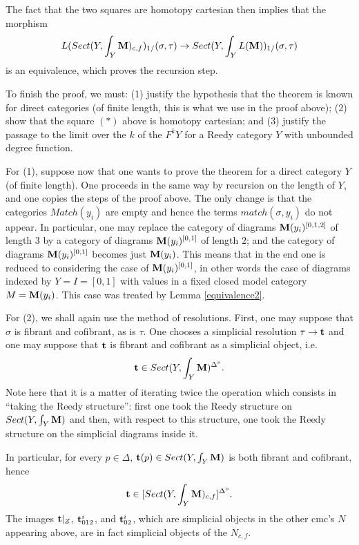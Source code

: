 The fact that the two squares are
homotopy cartesian then implies that the morphism
$$
L(Sect (Y, \int _Y{\bf M} )_{c,f})_{1/}(\sigma , \tau )
\rightarrow Sect (Y, \int _Y L({\bf M} ))_{1/}(\sigma , \tau )
$$
is an equivalence, which proves the recursion step.

To finish the proof, we must: (1) justify the hypothesis that
the theorem is known for direct categories (of finite length,
this is what we use in the proof above); (2) show that the
square $(\ast )$ above is homotopy cartesian; and (3) justify the
passage to the limit over
the $k$ of the $F^kY$ for a Reedy category $Y$ with
unbounded degree function.

For (1), suppose now that one wants to prove the theorem for a
direct category $Y$ (of finite length). One proceeds in the same way
by recursion on the length of $Y$, and one copies the steps of the
proof above. The only change is that the categories
$Match(y_i)$ are empty and hence the terms $match (\sigma , y_i)$
do not appear. In particular, one may replace
the category of diagrams
${\bf M} (y_i)^{[0,1,2]}$ of length $3$ by a category of
diagrams ${\bf M} (y_i)^{[0,1]}$ of length $2$; and the category of diagrams
${\bf M} (y_i)^{[0,1]}$ becomes just ${\bf M} (y_i)$. This means that in the end
one is reduced to considering the case of ${\bf M} (y_i)^{[0,1]}$,
in other words the case of diagrams indexed by $Y= I=[0,1]$ with values in
a fixed closed model category $M={\bf M} (y_i)$. This case was
treated by Lemma \ref{equivalence2}.

For (2), we shall again use the method of resolutions. First, one may
suppose that $\sigma$ is fibrant and cofibrant, as is $\tau$. One chooses
a simplicial resolution $\tau \rightarrow {\bf t}$ and one may
suppose that ${\bf t}$ is fibrant and cofibrant as a simplicial object,
i.e.
$$
{\bf t}\in Sect (Y,\int _Y{\bf M} )^{\Delta ^o}.
$$
Note here that it is a matter of iterating twice the operation
which consists in ``taking the
Reedy structure'': first one took the Reedy structure on
$Sect (Y,\int _Y{\bf M} )$ and then, with respect to this structure, one took
the Reedy structure on the simplicial diagrams inside it.

In particular, for every $p\in \Delta$, ${\bf t}(p)\in Sect (Y,\int _Y{\bf M} )$
is both fibrant and cofibrant, hence
$$
{\bf t}\in [Sect (Y,\int _Y{\bf M} )_{c,f}]^{\Delta ^o}.
$$
The images ${\bf t} |_Z$,  ${\bf t} ^i_{012}$, and  ${\bf t} ^i_{02}$,
which are simplicial objects in the other cmc's $N$ appearing above,
are in fact simplicial objects of the $N_{c,f}$.

